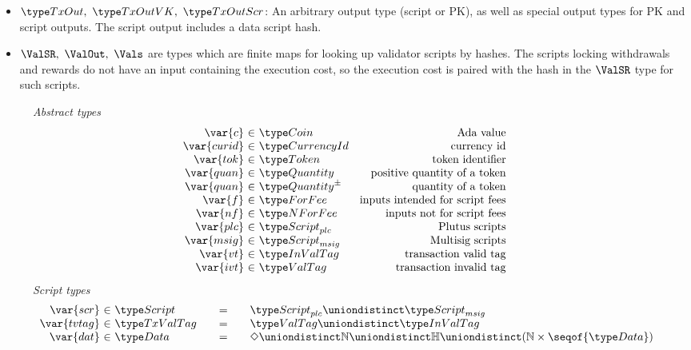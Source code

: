 \begin{itemize}
  \item $\TxOut,~\TxOutVK,~\TxOutScr$: An arbitrary output type (script or PK),
  as well as special output types for PK and script outputs. The script output
  includes a data script hash.

  \item $\ValSR,~\ValOut,~\Vals$ are types which are finite maps for looking up
  validator scripts by hashes. The scripts locking withdrawals and rewards
  do not have an input containing the execution cost, so the execution cost
  is paired with the hash in the $\ValSR$ type for such scripts.
\end{itemize}


\begin{figure*}[htb]
  \emph{Abstract types}
  \begin{equation*}
    \begin{array}{r@{~\in~}lr}
      \var{c} & \Coin & \text{Ada value}\\
      \var{curid} & \CurrencyId & \text{currency id}\\
      \var{tok} & \Token & \text{token identifier}\\
      \var{quan} & \Quantity & \text{positive quantity of a token}\\
      \var{quan} & \QuantityPM & \text{quantity of a token}\\
      \var{f} & \ForFee & \text{inputs intended for script fees} \\
      \var{nf} & \NForFee & \text{inputs not for script fees} \\
      \var{plc} & \ScriptPlutus & \text{Plutus scripts} \\
      \var{msig} & \ScriptMSig & \text{Multisig scripts} \\
      \var{vt} & \InValTag & \text{transaction valid tag} \\
      \var{ivt} & \ValTag & \text{transaction invalid tag} \\
    \end{array}
  \end{equation*}
  \emph{Script types}
  \begin{equation*}
    \begin{array}{r@{~\in~}l@{\qquad=\qquad}lr}
      \var{scr} & \Script & \ScriptPlutus \uniondistinct \ScriptMSig \\
      \var{tvtag} & \TxValTag & \ValTag \uniondistinct \InValTag \\
      \var{dat}
      & \Data
      & \Nothing \uniondistinct \mathbb{N}\uniondistinct\mathbb{H}\uniondistinct(\mathbb{N}\times\seqof{\Data})

\end{array}
\end{equation*}
\end{figure*}
